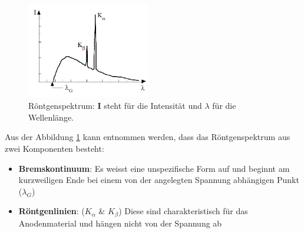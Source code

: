 \begin{figure}
\centering
\includegraphics[width=0.48\textwidth]{Bilder/roentgen_spektrum.png}
\caption[Röntgenspektrum]{Röntgenspektrum: \textbf{I} steht für die Intensität und $\lambda$ für die Wellenlänge.}
\vspace{-1.5cm}
\label{fig:roentgenspektrum}
\end{figure}

Aus der Abbildung \ref{fig:roentgenspektrum} kann entnommen werden, dass das Röntgenspektrum aus zwei Komponenten besteht:\\
\begin{itemize}
\item \textbf{Bremskontinuum}: Es weisst eine unspezifische Form auf und beginnt am kurzweiligen Ende bei einem von der angelegten Spannung abhängigen Punkt ($\lambda_{G}$)\\
\item \textbf{Röntgenlinien}: ($K_{\alpha}$ \& $K_{\beta}$) Diese sind charakteristisch für das Anodenmaterial und hängen nicht von der Spannung ab\\
\end{itemize}


